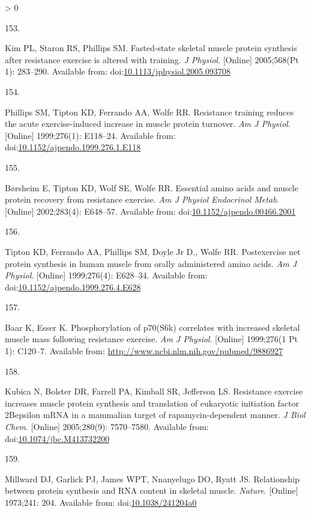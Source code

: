 \documentclass[twoside,10pt]{gihclass} %
\newlength{\cslhangindent}
\newlength{\csllabelwidth}
\newenvironment{CSLReferences}[3] %
 {%
  \setlength{\parindent}{0pt}
  \ifodd #1 \everypar{\setlength{\hangindent}{\cslhangindent}}\ignorespaces\fi
  \ifnum #2 > 0
  \setlength{\parskip}{#2\baselineskip}
  \fi
 }%
 {}
\newcommand{\CSLLeftMargin}[1]{\parbox[t]{\maxof{\widthof{#1}}{\csllabelwidth}}{#1}}
\newcommand{\CSLRightInline}[1]{\parbox[t]{\linewidth}{#1}}
\begin{document}
\begin{CSLReferences}{0}{0}
\leavevmode\hypertarget{ref-RN1521}{}%
\CSLLeftMargin{153. }
\CSLRightInline{Kim PL, Staron RS, Phillips SM. Fasted-state skeletal muscle protein synthesis after resistance exercise is altered with training. \emph{J Physiol}. {[}Online{]} 2005;568(Pt 1): 283--290. Available from: doi:\href{https://doi.org/10.1113/jphysiol.2005.093708}{10.1113/jphysiol.2005.093708}}

\leavevmode\hypertarget{ref-RN2713}{}%
\CSLLeftMargin{154. }
\CSLRightInline{Phillips SM, Tipton KD, Ferrando AA, Wolfe RR. Resistance training reduces the acute exercise-induced increase in muscle protein turnover. \emph{Am J Physiol}. {[}Online{]} 1999;276(1): E118--24. Available from: doi:\href{https://doi.org/10.1152/ajpendo.1999.276.1.E118}{10.1152/ajpendo.1999.276.1.E118}}

\leavevmode\hypertarget{ref-RN2714}{}%
\CSLLeftMargin{155. }
\CSLRightInline{Børsheim E, Tipton KD, Wolf SE, Wolfe RR. Essential amino acids and muscle protein recovery from resistance exercise. \emph{Am J Physiol Endocrinol Metab}. {[}Online{]} 2002;283(4): E648--57. Available from: doi:\href{https://doi.org/10.1152/ajpendo.00466.2001}{10.1152/ajpendo.00466.2001}}

\leavevmode\hypertarget{ref-RN2715}{}%
\CSLLeftMargin{156. }
\CSLRightInline{Tipton KD, Ferrando AA, Phillips SM, Doyle Jr D., Wolfe RR. Postexercise net protein synthesis in human muscle from orally administered amino acids. \emph{Am J Physiol}. {[}Online{]} 1999;276(4): E628--34. Available from: doi:\href{https://doi.org/10.1152/ajpendo.1999.276.4.E628}{10.1152/ajpendo.1999.276.4.E628}}

\leavevmode\hypertarget{ref-RN866}{}%
\CSLLeftMargin{157. }
\CSLRightInline{Baar K, Esser K. Phosphorylation of p70(S6k) correlates with increased skeletal muscle mass following resistance exercise. \emph{Am J Physiol}. {[}Online{]} 1999;276(1 Pt 1): C120--7. Available from: \url{http://www.ncbi.nlm.nih.gov/pubmed/9886927}}

\leavevmode\hypertarget{ref-RN860}{}%
\CSLLeftMargin{158. }
\CSLRightInline{Kubica N, Bolster DR, Farrell PA, Kimball SR, Jefferson LS. Resistance exercise increases muscle protein synthesis and translation of eukaryotic initiation factor 2Bepsilon mRNA in a mammalian target of rapamycin-dependent manner. \emph{J Biol Chem}. {[}Online{]} 2005;280(9): 7570--7580. Available from: doi:\href{https://doi.org/10.1074/jbc.M413732200}{10.1074/jbc.M413732200}}

\leavevmode\hypertarget{ref-RN2145}{}%
\CSLLeftMargin{159. }
\CSLRightInline{Millward DJ, Garlick PJ, James WPT, Nnanyelugo DO, Ryatt JS. Relationship between protein synthesis and RNA content in skeletal muscle. \emph{Nature}. {[}Online{]} 1973;241: 204. Available from: doi:\href{https://doi.org/10.1038/241204a0}{10.1038/241204a0}}


\end{CSLReferences}
\end{document}
